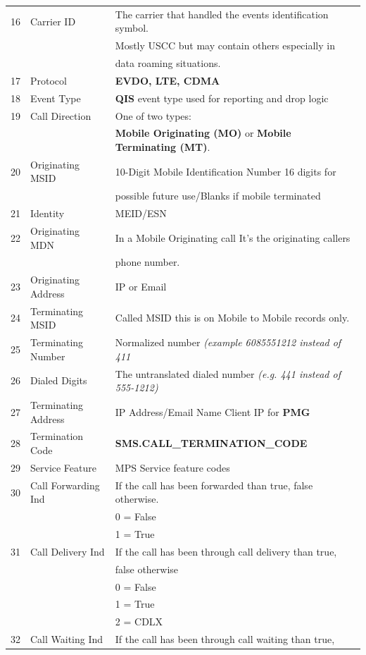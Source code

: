 \documentclass[12pt,twoside]{article}
\begin{document}
\begin{longtable}{c|l|l}
16 & Carrier ID & The carrier that handled the events identification symbol.\\
 &  & Mostly USCC but may contain others especially in\\
 &  & data roaming situations.\\
17 & Protocol & \textbf{EVDO, LTE, CDMA}\\
18 & Event Type & \textbf{QIS} event type used for reporting and drop logic\\
19 & Call Direction & One of two types:\\
 &  & \textbf{Mobile Originating (MO)} or \textbf{Mobile Terminating (MT)}.\\
20 & Originating MSID & 10-Digit Mobile Identification Number 16 digits for\\
 &  & possible future use/Blanks if mobile terminated\\
21 & Identity & MEID/ESN\\
22 & Originating MDN & In a Mobile Originating call It's the originating callers\\
 &  & phone number.\\
23 & Originating Address & IP or Email\\
24 & Terminating MSID & Called MSID this is on Mobile to Mobile records only.\\
25 & Terminating Number & Normalized number \emph{(example 6085551212 instead of 411}\\
26 & Dialed Digits & The untranslated dialed number \emph{(e.g. 441 instead of 555-1212)}\\
27 & Terminating Address & IP Address/Email Name Client IP for \textbf{PMG}\\
28 & Termination Code & \textbf{SMS.CALL\_TERMINATION\_CODE}\\
29 & Service Feature & MPS Service feature codes\\
30 & Call Forwarding Ind & If the call has been forwarded than true, false otherwise.\\
 &  & 0 = False\\
 &  & 1 = True\\
31 & Call Delivery Ind & If the call has been through call delivery than true,\\
 &  & false otherwise\\
 &  & 0 = False\\
 &  & 1 = True\\
 &  & 2 = CDLX\\
32 & Call Waiting Ind & If the call has been through call waiting than true,\\

\end{longtable}
\end{document}
